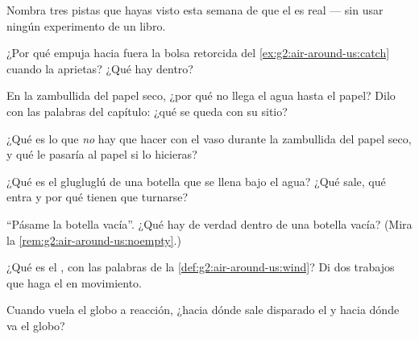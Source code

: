 \begin{exercise}[$\star$]\label{exo:g2:air-around-us:1}
Nombra tres pistas que hayas visto esta semana de que el  es real
--- sin usar ningún experimento de un libro.
\end{exercise}

\begin{exercise}[$\star$]\label{exo:g2:air-around-us:2}
¿Por qué empuja hacia fuera la bolsa retorcida del
\cref{ex:g2:air-around-us:catch} cuando la aprietas? ¿Qué hay dentro?
\end{exercise}

\begin{exercise}[$\star$]\label{exo:g2:air-around-us:3}
En la zambullida del papel seco, ¿por qué no llega el agua hasta el
papel? Dilo con las palabras del capítulo: ¿qué se queda con su sitio?
\end{exercise}

\begin{exercise}[$\star$]\label{exo:g2:air-around-us:4}
¿Qué es lo que \emph{no} hay que hacer con el vaso durante la
zambullida del papel seco, y qué le pasaría al papel si lo hicieras?
\end{exercise}

\begin{exercise}[$\star$]\label{exo:g2:air-around-us:5}
¿Qué es el glugluglú de una botella que se llena bajo el agua? ¿Qué
sale, qué entra y por qué tienen que turnarse?
\end{exercise}

\begin{exercise}[$\star$]\label{exo:g2:air-around-us:6}
``Pásame la botella vacía''. ¿Qué hay de verdad dentro de una botella
vacía? (Mira la \cref{rem:g2:air-around-us:noempty}.)
\end{exercise}

\begin{exercise}[$\star$]\label{exo:g2:air-around-us:7}
¿Qué es el , con las palabras de la
\cref{def:g2:air-around-us:wind}? Di dos trabajos que haga el  en
movimiento.
\end{exercise}

\begin{exercise}[$\star$]\label{exo:g2:air-around-us:8}
Cuando vuela el globo a reacción, ¿hacia dónde sale disparado el
 y hacia dónde va el globo?
\end{exercise}

